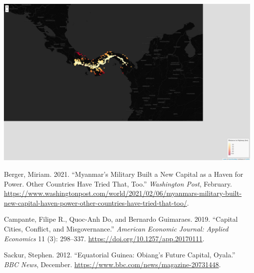 \documentclass[
  letterpaper,
  DIV=11,
  numbers=noendperiod]{scrartcl}
\newlength{\cslhangindent}
\newenvironment{CSLReferences}[2] %
 {\begin{list}{}{%
  \setlength{\itemindent}{0pt}
  \setlength{\leftmargin}{0pt}
  \setlength{\parsep}{0pt}
  \ifodd #1
   \setlength{\leftmargin}{\cslhangindent}
   \setlength{\itemindent}{-1\cslhangindent}
  \fi
  \setlength{\itemsep}{#2\baselineskip}}}
 {\end{list}}
\begin{document}
\includegraphics{index_files/figure-pdf/highway-distances-2.pdf}

\label{refs}
\begin{CSLReferences}{1}{0}
Berger, Miriam. 2021. {``Myanmar's Military Built a New Capital as a
Haven for Power. {Other} Countries Have Tried That, Too.''}
\emph{Washington Post}, February.
\url{https://www.washingtonpost.com/world/2021/02/06/myanmars-military-built-new-capital-haven-power-other-countries-have-tried-that-too/}.

Campante, Filipe R., Quoc-Anh Do, and Bernardo Guimaraes. 2019.
{``Capital {Cities}, {Conflict}, and {Misgovernance}.''} \emph{American
Economic Journal: Applied Economics} 11 (3): 298--337.
\url{https://doi.org/10.1257/app.20170111}.

Sackur, Stephen. 2012. {``Equatorial {Guinea}: {Obiang}'s Future
Capital, {Oyala}.''} \emph{BBC News}, December.
\url{https://www.bbc.com/news/magazine-20731448}.

\end{CSLReferences}
\end{document}
